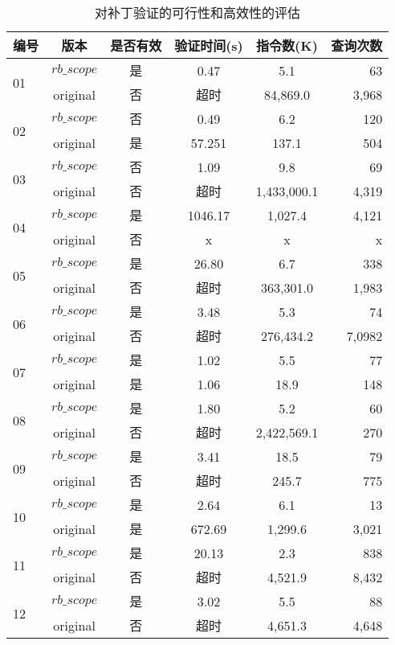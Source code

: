 \begin{table}
  \centering
  \small
  \begin{tabular}{|p{0.80cm}|c|c|c|c|r|}
    \hline
    编号 & 版本 & 是否有效 & 验证时间(s)& 指令数(K) & 查询次数 \\
    \hline
    \multirow{2}{0.80cm}{01}
    & $rb\_scope$ &是 &  0.47  & 5.1 & 63  \\  \cline{2-6}
    & original &  否 & 超时 &   84,869.0 & 3,968  \\
    \hline
    \multirow{2}{0.80cm}{02}
    & $rb\_scope$ &否 & 0.49 & 6.2 & 120  \\  \cline{2-6}
    & original & 是 & 57.251 &  137.1 & 504  \\
    \hline
    \multirow{2}{0.80cm}{03}
    & $rb\_scope$ &否 & 1.09 & 9.8 & 69  \\  \cline{2-6}
    & original &  否 & 超时 &  1,433,000.1 & 4,319  \\
    \hline
    \multirow{2}{0.80cm}{04}
    & $rb\_scope$ &是 &  1046.17 & 1,027.4 & 4,121  \\  \cline{2-6}
    & original & 否 & x &  x & x  \\
    \hline
    \multirow{2}{0.80cm}{05}
    & $rb\_scope$ &是 &  26.80 & 6.7 & 338  \\  \cline{2-6}
    & original & 否 & 超时 &  363,301.0 & 1,983   \\
    \hline
    \multirow{2}{0.80cm}{06}
    & $rb\_scope$ &是 &  3.48 & 5.3 & 74  \\  \cline{2-6}
    & original & 否 &超时  & 276,434.2 & 7,0982  \\
    \hline
    \multirow{2}{0.80cm}{07}
    & $rb\_scope$ &是 &  1.02 & 5.5 & 77  \\  \cline{2-6}
    & original & 是 & 1.06 & 18.9   & 148  \\
    \hline
    \multirow{2}{0.80cm}{08}
    & $rb\_scope$ &是 &  1.80 & 5.2 & 60  \\  \cline{2-6}
    & original & 否 & 超时 &  2,422,569.1 & 270  \\
    \hline
    \multirow{2}{0.80cm}{09}
    & $rb\_scope$ &是 &  3.41 & 18.5 & 79  \\  \cline{2-6}
    & original & 否 & 超时 &  245.7 & 775  \\
    \hline
    \multirow{2}{0.80cm}{10}
    & $rb\_scope$ &是 &  2.64 & 6.1 & 13  \\  \cline{2-6}
    & original & 是 & 672.69  &  1,299.6 & 3,021  \\
    \hline
    \multirow{2}{0.80cm}{11}
    & $rb\_scope$ &是 &  20.13 & 2.3 & 838  \\  \cline{2-6}
    & original & 否 & 超时  &  4,521.9 & 8,432  \\
    \hline
    \multirow{2}{0.80cm}{12}
    & $rb\_scope$ &是 &  3.02 & 5.5 & 88  \\  \cline{2-6}
    & original & 否 & 超时 &  4,651.3 & 4,648  \\
    \hline
  \end{tabular}
  \caption{对补丁验证的可行性和高效性的评估}
  \label{tab:eval1}
\end{table}

